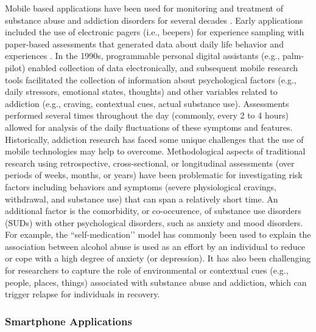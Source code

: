 \documentclass[sigconf]{acmart}
\begin{document}
Mobile based applications have been used for monitoring and treatment of 
substance abuse and addiction disorders for several decades \cite{boyer10}. 
Early applications included the use of electronic pagers (i.e., beepers) 
for experience sampling with paper-based assessments that generated data about 
daily life behavior and experiences \cite{swedenson16}. In the 1990s, programmable 
personal digital assistants (e.g., palm-pilot) enabled collection of data 
electronically, and subsequent mobile research tools facilitated the collection 
of information about psychological factors (e.g., daily stressors, emotional 
states, thoughts) and other variables related to addiction (e.g., craving, 
contextual cues, actual substance use). Assessments performed several times 
throughout the day (commonly, every 2 to 4 hours) allowed for analysis of the 
daily fluctuations of these symptoms and features. Historically, addiction 
research has faced some unique challenges that the use of mobile technologies 
may help to overcome. Methodological aspects of traditional research using 
retrospective, cross-sectional, or longitudinal assessments (over periods of 
weeks, months, or years) have been problematic for investigating risk factors 
including behaviors and symptoms (severe physiological cravings, withdrawal, 
and substance use) that can span a relatively short time. An additional factor 
is the comorbidity, or co-occurence, of substance use disorders (SUDs) with other 
psychological disorders, such as anxiety and mood disorders. For example, the 
``self-medication’’ model has commonly been used to explain the association 
between alcohol abuse is used as an effort by an individual to reduce or cope 
with a high degree of anxiety (or depression). It has also been challenging 
for researchers to capture the role of environmental or contextual cues (e.g., 
people, places, things) associated with substance abuse and addiction, which 
can trigger relapse for individuals in recovery.


\subsubsection*{Smartphone Applications}
\end{document}
